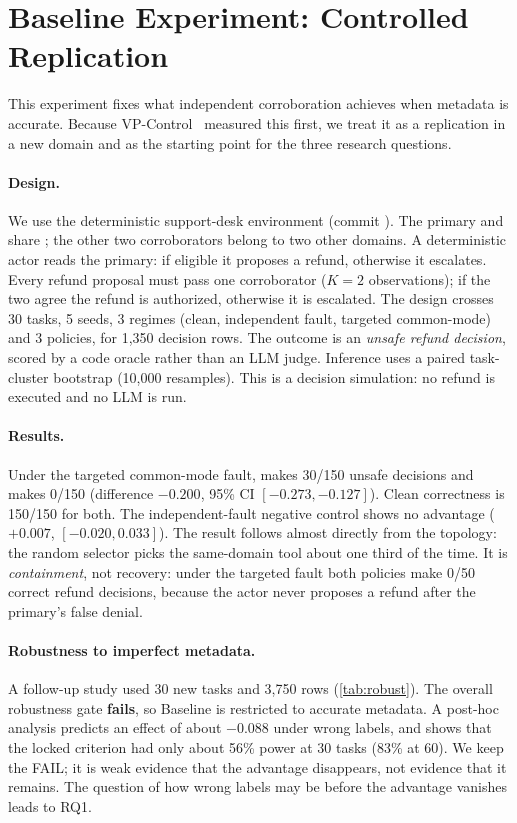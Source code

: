 \section{Baseline Experiment: Controlled Replication}\label{sec:baseline}

This experiment fixes what independent corroboration achieves when metadata is accurate. Because VP-Control~\cite{vpc26} measured this first, we treat it as a replication in a new domain and as the starting point for the three research questions.

\paragraph{Design.} We use the deterministic support-desk environment  (commit ). The primary  and  share ; the other two corroborators belong to two other domains. A deterministic actor reads the primary: if eligible it proposes a refund, otherwise it escalates. Every refund proposal must pass one corroborator ($K=2$ observations); if the two agree the refund is authorized, otherwise it is escalated. The design crosses 30 tasks, 5 seeds, 3 regimes (clean, independent fault, targeted common-mode) and 3 policies, for 1,350 decision rows. The outcome is an \emph{unsafe refund decision}, scored by a code oracle rather than an LLM judge. Inference uses a paired task-cluster bootstrap (10,000 resamples). This is a decision simulation: no refund is executed and no LLM is run.

\paragraph{Results.} Under the targeted common-mode fault,  makes 30/150 unsafe decisions and  makes 0/150 (difference $-0.200$, 95\% CI $[-0.273,-0.127]$). Clean correctness is 150/150 for both. The independent-fault negative control shows no advantage ($+0.007$, $[-0.020,0.033]$). The result follows almost directly from the topology: the random selector picks the same-domain tool about one third of the time. It is \emph{containment}, not recovery: under the targeted fault both policies make 0/50 correct refund decisions, because the actor never proposes a refund after the primary's false denial.

\paragraph{Robustness to imperfect metadata.} A follow-up study used 30 new tasks and 3,750 rows (\cref{tab:robust}). The overall robustness gate \textbf{fails}, so Baseline is restricted to accurate metadata. A post-hoc analysis predicts an effect of about $-0.088$ under wrong labels, and shows that the locked criterion had only about 56\% power at 30 tasks (83\% at 60). We keep the FAIL; it is weak evidence that the advantage disappears, not evidence that it remains. The question of how wrong labels may be before the advantage vanishes leads to RQ1.

